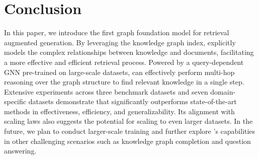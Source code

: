 \vspace{-0.2cm}
\section{Conclusion}\label{sec:conclusion}
In this paper, we introduce the first graph foundation model for retrieval augmented generation. By leveraging the knowledge graph index, \ourmethod explicitly models the complex relationships between knowledge and documents, facilitating a more effective and efficient retrieval process. Powered by a query-dependent GNN pre-trained on large-scale datasets, \ourmethod can effectively perform multi-hop reasoning over the graph structure to find relevant knowledge in a single step. Extensive experiments across three benchmark datasets and seven domain-specific datasets demonstrate that \ourmethod significantly outperforms state-of-the-art methods in effectiveness, efficiency, and generalizability. Its alignment with scaling laws also suggests the potential for scaling to even larger datasets. In the future, we plan to conduct larger-scale training and further explore \ourmethod's capabilities in other challenging scenarios such as knowledge graph completion and question answering.